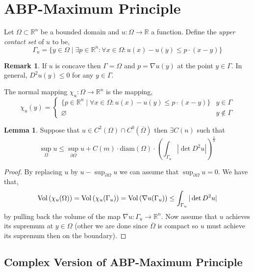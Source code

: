 \documentclass[12pt]{extarticle}
\newcommand{\R}{\mathbb{R}}
\theoremstyle{definition}
\newtheorem{lemma}[theorem]{Lemma}
\newtheorem{remark}{Remark}
\newenvironment{definition}[1][Definition:]{\begin{trivlist}
\item[\hskip \labelsep {\bfseries #1}]}{\end{trivlist}}
\begin{document}
\section{ABP-Maximum Principle}

\begin{definition}
Let $\Omega \subset \R^n$ be a bounded domain and $u : \Omega \to \R$ a function. Define the \textit{upper contact set} of $u$ to be,
\[ \Gamma_u = \{ y \in \Omega \mid \exists p \in \R^n : \forall x  \in \Omega : u(x) - u(y) \le p \cdot (x - y) \} \] 
\end{definition}

\begin{remark}
If $u$ is concave then $\Gamma = \Omega$ and $p = \nabla u(y)$ at the point $y \in \Gamma 
$. In general, $D^2 u(y) \le 0$ for any $y \in \Gamma$. 
\end{remark}

\begin{definition}
The normal mapping $\chi_u : \Omega \to \R^n$ is the mapping,
\[ \chi_u(y) = 
\begin{cases}
\{ p \in \R^n \mid \forall x  \in \Omega : u(x) - u(y) \le p \cdot (x - y) \} & y \in \Gamma
\\
\varnothing & y \notin \Gamma 
\end{cases} \]
\end{definition}

\newcommand{\diam}[1]{\mathrm{diam}\left(#1\right)}

\begin{lemma}
Suppose that $u \in C^2(\Omega) \cap C^0(\overline{\Omega})$ then $\exists C(n)$ such that 
\[ \sup_{\Omega} u \le \sup_{\partial \Omega} u + C(m) \cdot \diam{\Omega} \cdot \left( \int_{\Gamma_u} |\det{D^2 u}| \right)^{\frac{1}{n}} \]
\end{lemma}

\begin{proof}
By replacing $u$ by $u - \sup_{\partial \Omega} u$ we can assume that $\sup_{\partial \Omega} u = 0$. We have that,
\[ \mathrm{Vol}\left(\chi_u(\Omega)\right) = \mathrm{Vol}\left(\chi_u(\Gamma_u)\right) = \mathrm{Vol}\left(\nabla u(\Gamma_u)\right) \le \int_{\Gamma_u} | \det{D^2 u}| \]
by pulling back the volume of the map $\nabla u : \Gamma_u \to \R^n$. Now assume that $u$ achieves its supremum at $y \in \Omega$ (other we are done since $\overline{\Omega}$ is compact so $u$ must achieve its supremum then on the boundary). 
\end{proof}

\subsection{Complex Version of ABP-Maximum Principle}
\end{document}

